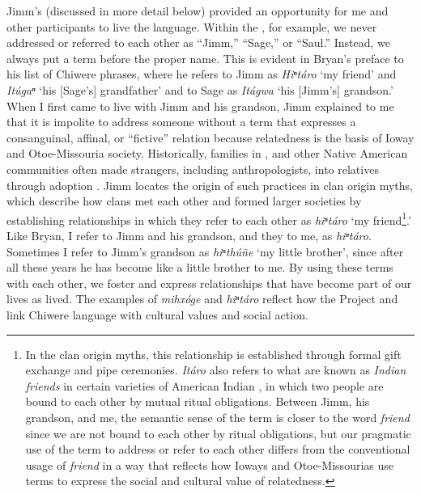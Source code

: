 \documentclass[output=paper]{LSP/langsci}
\begin{document}
Jimm's  (discussed in more detail below) provided an opportunity for me and other participants to live the language. Within the , for example, we never addressed or referred to each other as ``Jimm,'' ``Sage,'' or ``Saul.'' Instead, we always put a  term before the proper name. This is evident in Bryan's preface to his list of Chiwere phrases, where he refers to Jimm as \emph{Hiⁿtáro} `my friend' and \emph{Itúgaⁿ} `his [Sage's] grandfather' and to Sage as \emph{Itágwa} `his [Jimm's] grandson.' When I first came to live with Jimm and his grandson, Jimm explained to me that it is impolite to address someone without a  term that expresses a consanguinal, affinal, or ``fictive'' relation because relatedness is the basis of Ioway and Otoe-Missouria society. Historically, families in , and other Native American communities often made strangers, including anthropologists, into relatives through adoption \citep[see e.g.][]{Kan2001}. Jimm locates the origin of such practices in clan origin myths, which describe how clans met each other and formed larger societies by establishing relationships in which they refer to each other as \emph{hiⁿtáro} `my friend\footnote{In the clan origin myths, this relationship is established through formal gift exchange and pipe ceremonies. \emph{Itáro} also refers to what are known as \emph{Indian friends} in certain varieties of American Indian , in which two people are bound to each other by mutual ritual obligations. Between Jimm, his grandson, and me, the semantic sense of the term is closer to the  word \emph{friend} since we are not bound to each other by ritual obligations, but our pragmatic use of the term to address or refer to each other differs from the conventional  usage of \emph{friend} in a way that reflects how Ioways and Otoe-Missourias use  terms to express the social and cultural value of relatedness.}.' Like Bryan, I refer to Jimm and his grandson, and they to me, as \emph{hiⁿtáro}. Sometimes I refer to Jimm's grandson as \emph{hiⁿthúñe} `my little brother', since after all these years he has become like a little brother to me. By using these  terms with each other, we foster and express relationships that have become part of our lives as lived. The examples of \emph{mihxóge} and \emph{hiⁿtáro} reflect how the Project and  link Chiwere language with cultural values and social action.
\end{document}
